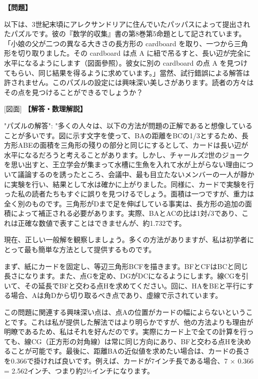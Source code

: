 \documentclass[10pt,a4paper,oneside,openany]{ltjsbook}
\begin{document}
\begin{tcolorbox}[colback=softblue,colframe=primaryblue,title=\textbf{第 199 問：PAPA'S PUZZLE.},arc=2mm,boxrule=1pt,breakable]
\textbf{【問題】}\par\vspace{0.3em}
以下は、3世紀末頃にアレクサンドリアに住んでいたパッパスによって提出されたパズルです。彼の『数学的収集』書の第8巻第5命題として記されています。「小娘の父が二つの異なる大きさの長方形の cardboard を取り、一つから三角形を切り取りました。その cardboard は点 A に紐で吊るすと、長い辺が完全に水平になるようにします（図面參照）。彼女に別の cardboard の点 A を見つけてもらい、同じ結果を得るように求めています。」當然、試行錯誤による解答は許されません。このパズルの設定には興味深い美しさがあります。読者の方々はその点を見つけることができるでしょうか？

[図面]
\tcblower
\textbf{【解答・数理解説】}\par\vspace{0.3em}
{
  "パズルの解答": "多くの人々は、以下の方法が問題の正解であると想像していることが多いです。図に示す文字を使って、BAの距離をBCの1/3とするため、長方形ABEの面積を三角形の殘りの部分と同じにするとして、カードは長い辺が水平になるだろうと考えることがあります。しかし、チャールズ2世のジョークを思い出すと、王立学会が集まって水槽に生魚を入れて水が上がらない理由について議論するのを誘ったところ、会議中、最も目立たないメンバーの一人が靜かに実験を行い、結果として水は確かに上がりました。同様に、カードで実験を行った私の読者たちもすぐに誤りを見つけるでしょう。面積は一つですが、重力は全く別のものです。三角形がDまで足を伸ばしている事実は、長方形の追加の面積によって補正される必要があります。実際、BAとACの比は1対√3であり、これは正確な数値で表すことはできませんが、約1.732です。

現在、正しい一般解を観察しましょう。多くの方法がありますが、私は初学者にとって最も簡単な方法として提供するものです。

まず、紙にカードを固定し、等辺三角形BCFを描きます。BFとCFはBCと同じ長さになります。また、点Gを定め、DGがDCになるようにします。線CGを引いて、その延長でBFと交わる点Hを求めてください。回に、HAをBEと平行にする場合、Aは角Dから切り取るべき点であり、虛線で示されています。

この問題に関連する興味深い点は、点Aの位置がカードの幅によらないということです。これは私が提供した解法ではより明らかですが、他の方法よりも理由が明瞭であるため、私はそれを好んだのです。実際にカード上で全ての計算を行っても、線CG（正方形の対角線）は常に同じ方向にあり、BFと交わる点Hを決めることが可能です。最後に、距離BAの近似値を求めたい場合は、カードの長さを0.366で掛ければ良いです。例えば、カードが7インチ長である場合、7 × 0.366 = 2.562インチ、つまり約2½インチになります。

}
\end{tcolorbox}
\end{document}

